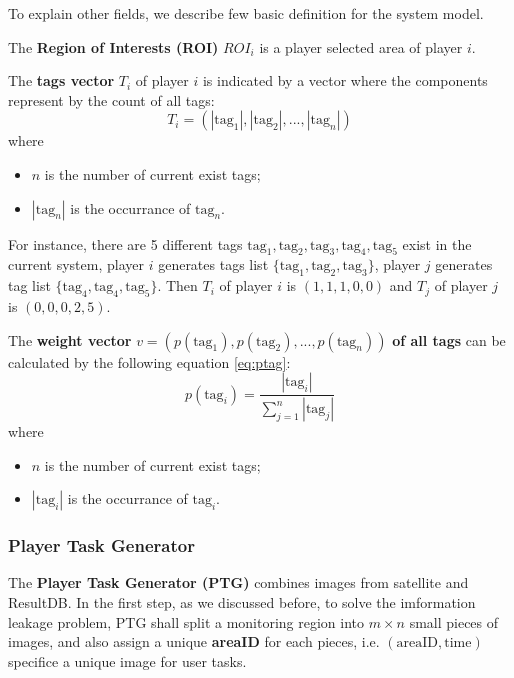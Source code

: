 To explain other fields, we describe few basic definition for the system model.

\begin{definition}
\label{def:roi}
The \textbf{Region of Interests (ROI)} $ROI_i$ is a player selected area of player $i$.
\end{definition}

\begin{definition}
\label{def:tagv}
The \textbf{tags vector} $T_i$ of player $i$ is indicated by a vector where the components represent by the count of all tags:
\[
  T_i = (|\text{tag}_1|, |\text{tag}_2|, ..., |\text{tag}_n|)
\]
where 
\begin{itemize}
\item $n$ is the number of current exist tags;
\item $|\text{tag}_n|$ is the occurrance of $\text{tag}_n$.
\end{itemize}
\end{definition}
For instance, there are 5 different tags $\text{tag}_1, \text{tag}_2, \text{tag}_3, \text{tag}_4, \text{tag}_5$ exist in the current system,
player $i$ generates tags list $\{\text{tag}_1, \text{tag}_2, \text{tag}_3\}$, player $j$ generates tag list
$\{\text{tag}_4, \text{tag}_4, \text{tag}_5\}$. Then $T_i$ of player $i$ is $(1, 1, 1, 0, 0)$ and $T_j$ of player $j$ is $(0, 0, 0, 2, 5)$.

\begin{definition}
\label{def:weightv}
The \textbf{weight vector} $v = (p(\text{tag}_1), p(\text{tag}_2), ..., p(\text{tag}_n))$ \textbf{of all tags} 
can be calculated by the following equation \ref{eq:ptag}:
\begin{equation}
\label{eq:ptag}
p(\text{tag}_i) = \frac{|\text{tag}_i|}{\sum_{j=1}^{n}{|\text{tag}_j|}}
\end{equation}
where
\begin{itemize}
\item $n$ is the number of current exist tags;
\item $|\text{tag}_i|$ is the occurrance of $\text{tag}_i$.
\end{itemize}
\end{definition}

\subsubsection{Player Task Generator}

The \textbf{Player Task Generator (PTG)} combines images from satellite and ResultDB. 
In the first step, as we discussed before, to solve the imformation leakage problem,
PTG shall split a monitoring region into $m\times n$ small pieces of images, and also assign a 
unique \textbf{areaID} for each pieces, i.e. $(\text{areaID}, \text{time})$ 
specifice a unique image for user tasks. 

